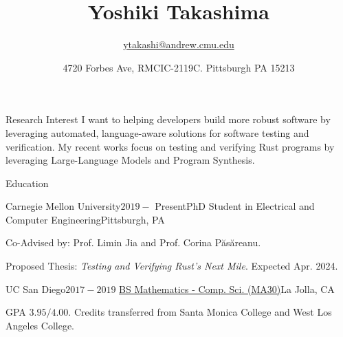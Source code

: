 \documentclass{resume} %
\title{\bf Yoshiki Takashima}
\author{\href{ytakashi@andrew.cmu.edu}{ytakashi@andrew.cmu.edu}}
\date{4720 Forbes Ave, RMCIC-2119C. Pittsburgh PA 15213}
\begin{document}
\maketitle

\begin{rSection}{Research Interest}
  I want to helping developers build more robust software by
  leveraging automated, language-aware solutions for software testing and
  verification. My recent works focus on testing and verifying Rust
  programs by leveraging Large-Language Models and Program Synthesis.
\end{rSection}

\begin{rSection}{Education}
  \begin{rSubsection}{Carnegie Mellon University}{$2019 -$
      Present}{PhD Student in Electrical and Computer
      Engineering}{Pittsburgh, PA}
  \item Co-Advised by: Prof. Limin Jia and Prof. Corina P\u{a}s\u{a}reanu.
  \item Proposed Thesis: \textit{Testing and Verifying Rust's Next Mile}. Expected Apr. 2024.
  \end{rSubsection}

  \begin{rSubsection}{UC San Diego}{$2017 -
      2019$}{
      \href{https://catalog.ucsd.edu/curric/MATH-ug.html}
      {BS Mathematics - Comp. Sci. (MA30)}}{La Jolla, CA}
  \item GPA $3.95/4.00$. Credits transferred from Santa Monica College
    and West Los Angeles College.
  \end{rSubsection}


\end{rSection}
\end{document}
